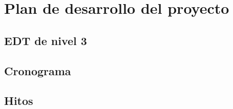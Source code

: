 \chapter{Plan de desarrollo del proyecto}
\label{appendix:planning}
\blindtext

\section{EDT de nivel 3}
\blindtext

\section{Cronograma}
\blindtext

\section{Hitos}
\blindtext
